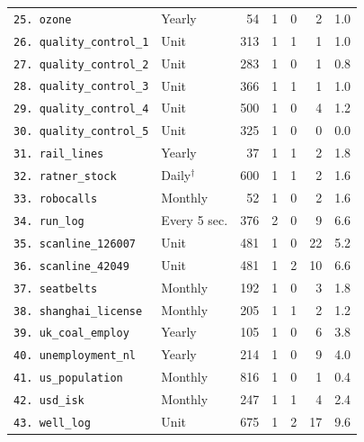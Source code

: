 \begin{tabular}{llrrrrr}
\verb+25. ozone+ & Yearly & 54 & 1 & 0 & 2 & 1.0 \\
\verb+26. quality_control_1+ & Unit & 313 & 1 & 1 & 1 & 1.0 \\
\verb+27. quality_control_2+ & Unit & 283 & 1 & 0 & 1 & 0.8 \\
\verb+28. quality_control_3+ & Unit & 366 & 1 & 1 & 1 & 1.0 \\
\verb+29. quality_control_4+ & Unit & 500 & 1 & 0 & 4 & 1.2 \\
\verb+30. quality_control_5+ & Unit & 325 & 1 & 0 & 0 & 0.0 \\
\verb+31. rail_lines+ & Yearly & 37 & 1 & 1 & 2 & 1.8 \\
\verb+32. ratner_stock+ & Daily$^{\dagger}$ & 600 & 1 & 1 & 2 & 1.6 \\
\verb+33. robocalls+ & Monthly & 52 & 1 & 0 & 2 & 1.6 \\
\verb+34. run_log+ & Every 5 sec. & 376 & 2 & 0 & 9 & 6.6 \\
\verb+35. scanline_126007+ & Unit & 481 & 1 & 0 & 22 & 5.2 \\
\verb+36. scanline_42049+ & Unit & 481 & 1 & 2 & 10 & 6.6 \\
\verb+37. seatbelts+ & Monthly & 192 & 1 & 0 & 3 & 1.8 \\
\verb+38. shanghai_license+ & Monthly & 205 & 1 & 1 & 2 & 1.2 \\
\verb+39. uk_coal_employ+ & Yearly & 105 & 1 & 0 & 6 & 3.8 \\
\verb+40. unemployment_nl+ & Yearly & 214 & 1 & 0 & 9 & 4.0 \\
\verb+41. us_population+ & Monthly & 816 & 1 & 0 & 1 & 0.4 \\
\verb+42. usd_isk+ & Monthly & 247 & 1 & 1 & 4 & 2.4 \\
\verb+43. well_log+ & Unit & 675 & 1 & 2 & 17 & 9.6 \\
\bottomrule
\end{tabular}